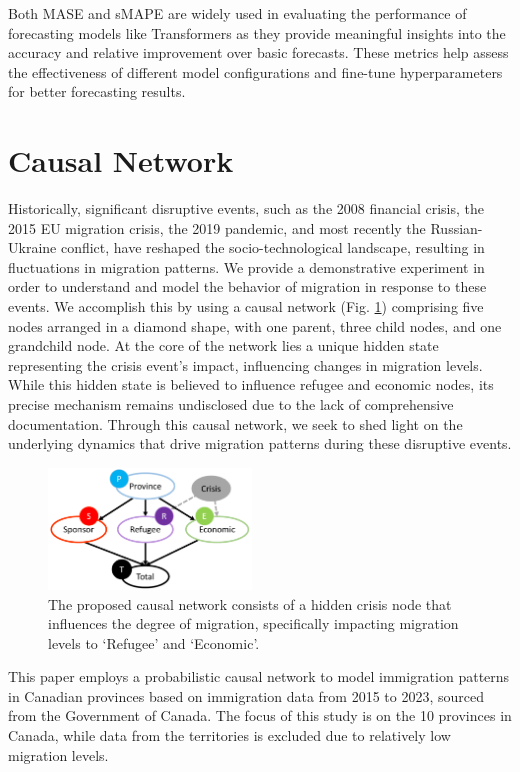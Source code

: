 \documentclass[conference]{IEEEtran}
\begin{document}
	Both MASE and sMAPE are widely used in evaluating the performance of forecasting models like Transformers as they provide meaningful insights into the accuracy and relative improvement over basic forecasts. These metrics help assess the effectiveness of different model configurations and fine-tune hyperparameters for better forecasting results.
	
	\section{Causal Network}
	Historically, significant disruptive events, such as the 2008 financial crisis, the 2015 EU migration crisis, the 2019 pandemic, and most recently the Russian-Ukraine conflict, have reshaped the socio-technological landscape, resulting in fluctuations in migration patterns. We provide a demonstrative experiment in order to understand and model the behavior of migration in response to these events.  We accomplish this by using a causal network (Fig. \ref{fig:causalNetwork}) comprising five nodes arranged in a diamond shape, with one parent, three child nodes, and one grandchild node. At the core of the network lies a unique hidden state representing the crisis event's impact, influencing changes in migration levels. While this hidden state is believed to influence refugee and economic nodes, its precise mechanism remains undisclosed due to the lack of comprehensive documentation. Through this causal network, we seek to shed light on the underlying dynamics that drive migration patterns during these disruptive events.
	
	\begin{figure}[!h]
		\begin{center}
			\includegraphics[width=0.48\textwidth]{fig/bn.pdf}
			\caption{The proposed causal network consists of a hidden crisis node that influences the degree of migration, specifically impacting migration levels to `Refugee' and `Economic'.
			}\label{fig:causalNetwork}
		\end{center}
	\end{figure}
	
	This paper employs a probabilistic causal network to model immigration patterns in Canadian provinces based on immigration data from 2015 to 2023, sourced from the Government of Canada. The focus of this study is on the 10 provinces in Canada, while data from the territories is excluded due to relatively low migration levels.
	
\end{document}
